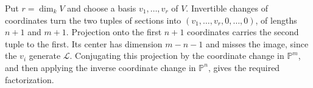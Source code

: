 Put $r=\dim_kV$ and choose a basis $v_1,\ldots,v_r$ of $V$. Invertible changes of coordinates turn the two tuples of sections into $(v_1,\ldots,v_r,0,\ldots,0)$, of lengths $n+1$ and $m+1$. Projection onto the first $n+1$ coordinates carries the second tuple to the first. Its center has dimension $m-n-1$ and misses the image, since the $v_i$ generate $\mathcal L$. Conjugating this projection by the coordinate change in $\mathbb P^m$, and then applying the inverse coordinate change in $\mathbb P^n$, gives the required factorization.
